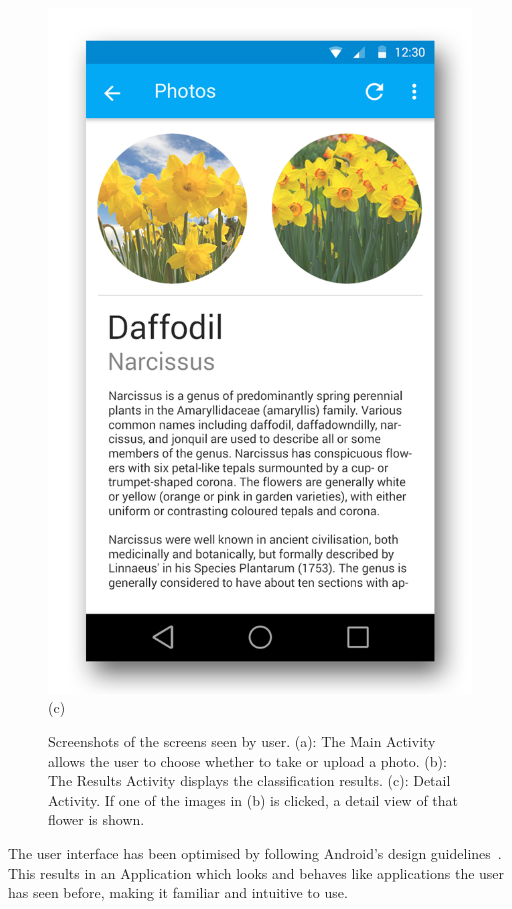\documentclass[11pt, a4paper]{report}
\begin{document}
\begin{figure}[h]
\begin{minipage}[b]{0.2\linewidth}
	\includegraphics[totalheight=6cm]{img/06.png}
	(c)
\end{minipage}
\caption{Screenshots of the screens seen by user. (a): The Main Activity allows the user to choose whether to take or upload a photo. (b): The Results Activity displays the classification results. (c): Detail Activity. If one of the images in (b) is clicked, a detail view of that flower is shown.}
\label{img:03}
\end{figure}

The user interface has been optimised by following Android's design guidelines~\cite{AndroidDev:Design}. This results in an Application which looks and behaves like applications the user has seen before, making it familiar and intuitive to use. 
\end{document}
